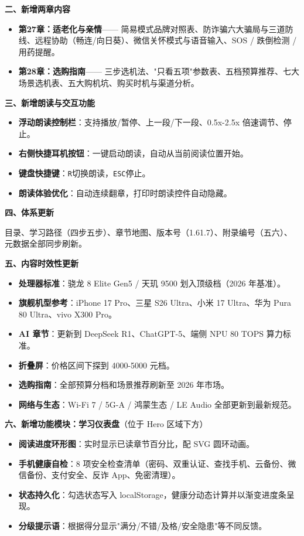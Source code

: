 \textbf{二、新增两章内容}

\begin{itemize}
  \item \textbf{第27章：适老化与亲情}—— 简易模式品牌对照表、防诈骗六大骗局与三道防线、远程协助（畅连/向日葵）、微信关怀模式与语音输入、SOS / 跌倒检测 / 用药提醒。
  \item \textbf{第28章：选购指南}—— 三步选机法、"只看五项"参数表、五档预算推荐、七大场景选机表、五大购机坑、购买时机与渠道分析。
\end{itemize}

\textbf{三、新增朗读与交互功能}

\begin{itemize}
  \item \textbf{浮动朗读控制栏}：支持播放/暂停、上一段/下一段、0.5x-2.5x 倍速调节、停止。
  \item \textbf{右侧快捷耳机按钮}：一键启动朗读，自动从当前阅读位置开始。
  \item \textbf{键盘快捷键}：\texttt{R}切换朗读，\texttt{ESC}停止。
  \item \textbf{朗读体验优化}：自动连续翻章，打印时朗读控件自动隐藏。
\end{itemize}

\textbf{四、体系更新}

目录、学习路径（四步五步）、章节地图、版本号（1.61.7）、附录编号（五六）、元数据全部同步刷新。

\textbf{五、内容时效性更新}

\begin{itemize}
  \item \textbf{处理器标准}：骁龙 8 Elite Gen5 / 天玑 9500 划入顶级档（2026 年基准）。
  \item \textbf{旗舰机型参考}：iPhone 17 Pro、三星 S26 Ultra、小米 17 Ultra、华为 Pura 80 Ultra、vivo X300 Pro。
  \item \textbf{AI 章节}：更新到 DeepSeek R1、ChatGPT-5、端侧 NPU 80 TOPS 算力标准。
  \item \textbf{折叠屏}：价格区间下探到 4000-5000 元档。
  \item \textbf{选购指南}：全部预算分档和场景推荐刷新至 2026 年市场。
  \item \textbf{网络与生态}：Wi-Fi 7 / 5G-A / 鸿蒙生态 / LE Audio 全部更新到最新规范。
\end{itemize}

\textbf{六、新增功能模块：学习仪表盘}（位于 Hero 区域下方）

\begin{itemize}
  \item \textbf{阅读进度环形图}：实时显示已读章节百分比，配 SVG 圆环动画。
  \item \textbf{手机健康自检}：8 项安全检查清单（密码、双重认证、查找手机、云备份、微信备份、支付安全、反诈 App、免密清理）。
  \item \textbf{状态持久化}：勾选状态写入 localStorage，健康分动态计算并以渐变进度条呈现。
  \item \textbf{分级提示语}：根据得分显示"满分/不错/及格/安全隐患"等不同反馈。
\end{itemize}

